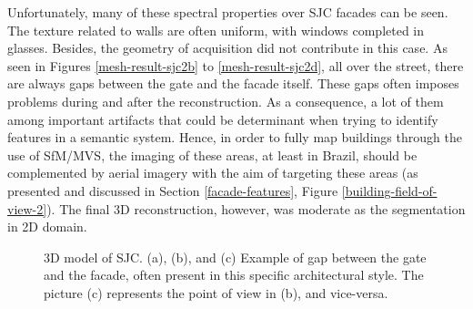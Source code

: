 Unfortunately, many of these spectral properties over SJC facades can be seen. The texture related to walls are often uniform, with windows completed in glasses. Besides, the geometry of acquisition did not contribute in this case. As seen in Figures \ref{mesh-result-sjc2b} to \ref{mesh-result-sjc2d}, all over the street, there are always gaps between the gate and the facade itself. These gaps often imposes problems during and after the reconstruction. As a consequence, a lot of them among important artifacts that could be determinant when trying to identify features in a semantic system. Hence, in order to fully map buildings through the use of SfM/MVS, the imaging of these areas, at least in Brazil, should be complemented by aerial imagery with the aim of targeting these areas (as presented and discussed in Section \ref{facade-features}, Figure \ref{building-field-of-view-2}). The final 3D reconstruction, however, was moderate as the segmentation in 2D domain. 
\begin{figure}[!htp]
    \centering   
    \caption{3D model of SJC. (a), (b), and (c) Example of gap between the gate and the facade, often present in this specific architectural style. The picture (c) represents the point of view in (b), and vice-versa.}
    \vspace{6mm}
    \vspace{2mm}
    \legenda{}
    \label{mesh-result-sjc2}
\end{figure}

